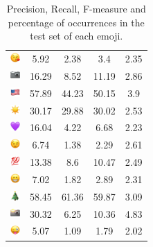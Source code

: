 \documentclass{article}
\begin{document}
\begin{table}
\begin{tabular}{|c|ccc|c|}
\includegraphics[height=0.37cm,width=0.37cm]{img/face_blowing_a_kiss.png} & 5.92 & 2.38 & 3.4 & 2.35\\ 
\includegraphics[height=0.37cm,width=0.37cm]{img/camera.png} & 16.29 & 8.52 & 11.19 & 2.86\\ 
\includegraphics[height=0.37cm,width=0.37cm]{img/United_States.png} & 57.89 & 44.23 & 50.15 & 3.9\\ 
\includegraphics[height=0.37cm,width=0.37cm]{img/sun.png} & 30.17 & 29.88 & 30.02 & 2.53\\ 
\includegraphics[height=0.37cm,width=0.37cm]{img/purple_heart.png} & 16.04 & 4.22 & 6.68 & 2.23\\ 
\includegraphics[height=0.37cm,width=0.37cm]{img/winking_face.png} & 6.74 & 1.38 & 2.29 & 2.61\\ 
\includegraphics[height=0.37cm,width=0.37cm]{img/hundred_points.png} & 13.38 & 8.6 & 10.47 & 2.49\\ 
\includegraphics[height=0.37cm,width=0.37cm]{img/beaming_face_with_smiling_eyes.png} & 7.02 & 1.82 & 2.89 & 2.31\\ 
\includegraphics[height=0.37cm,width=0.37cm]{img/Christmas_tree.png} & 58.45 & 61.36 & 59.87 & 3.09\\ 
\includegraphics[height=0.37cm,width=0.37cm]{img/camera_with_flash.png} & 30.32 & 6.25 & 10.36 & 4.83\\ 
\includegraphics[height=0.37cm,width=0.37cm]{img/winking_face_with_tongue.png} & 5.07 & 1.09 & 1.79 & 2.02\\ 

\hline
\end{tabular}
\caption{\label{table:emoji_detailed} Precision, Recall, F-measure and percentage of occurrences in the test set of each emoji.}
\end{table}
\end{document}

